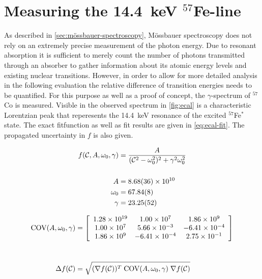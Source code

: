 
\section{Measuring the \SI{14.4}{\kilo\electronvolt} $^{57}$Fe-line}
\label{sec:ecal}

As described in \autoref{sec:mössbauer-spectroscopy}, Mössbauer spectroscopy does not
rely on an extremely precise measurement of the photon energy. Due to resonant
absorption it is sufficient to merely count the number of photons transmitted through
an absorber to gather information about its atomic energy levels and existing nuclear
transitions. However, in order to allow for more detailed analysis in the following
evaluation the relative difference of transition energies needs to be quantified.
For this purpose as well as a proof of concept, the $\gamma$-spectrum of $^{57}$Co is
measured. Visible in the observed spectrum in \autoref{fig:ecal} is a characteristic
Lorentzian peak that reperesents the \SI{14.4}{\kilo\electronvolt} resonance of the 
excited $^{57}$Fe$^{*}$ state. The exact fitfunction as well as fit results are given
in \autoref{eq:ecal-fit}. The propagated uncertainty in $f$ is also given.

\begin{align}
\label{eq:ecal-fit}
f(\mathcal{C},A,\omega_0,\gamma) &= \frac{A}{(\mathcal{C}^2-\omega_0^2)^2 + \gamma^2\omega_0^2} \\[15pt]
A &= \SI{8.68\pm 0.36e+10}{} \\
\omega_0 &= \SI{67.84\pm 0.08}{} \\
\gamma &= \SI{23.25\pm 0.52}{}
\end{align}

\begin{align*}
\text{COV}(A,\omega_0,\gamma) &=
\left[
\begin{array}{c c c}
1.28\times10^{19} & 1.00\times10^{7} & 1.86\times10^{9} \\
1.00\times10^{7} & 5.66\times10^{-3} & -6.41\times10^{-4} \\
1.86\times10^{9} & -6.41\times10^{-4} & 2.75\times10^{-1} \\
\end{array}
\right] \\[25pt]
\Delta f(\mathcal{C}) &= \sqrt{ (\nabla f(\mathcal{C}))^T\;\text{COV}(A,\omega_0,\gamma)\;\nabla f(\mathcal{C})}
\end{align*}

